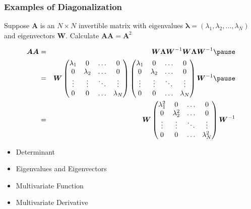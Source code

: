 \documentclass{beamer}
\numberwithin{equation}{section}
\begin{document}
\begin{frame}
\frametitle{Examples of Diagonalization}

Suppose $\boldsymbol{A}$ is an $N \times N$ invertible matrix with eigenvalues $\boldsymbol{\lambda} = (\lambda_{1}, \lambda_{2}, \hdots, \lambda_{N})$ and eigenvectors $\boldsymbol{W}$.  Calculate $\boldsymbol{A} \boldsymbol{A} = \boldsymbol{A}^{2}$ \pause

\begin{eqnarray}
\boldsymbol{A}\boldsymbol{A} & = & \boldsymbol{W} \boldsymbol{\Lambda} \boldsymbol{W}^{-1} \boldsymbol{W} \boldsymbol{\Lambda} \boldsymbol{W}^{-1} \nonumber \pause \\
& = &  \boldsymbol{W} \begin{pmatrix}
\lambda_{1} & 0 & \hdots & 0 \\
0 & \lambda_{2} & \hdots & 0 \\
\vdots & \vdots & \ddots & \vdots \\
0 & 0&  \hdots & \lambda_{N}\\
\end{pmatrix} \begin{pmatrix}
\lambda_{1} & 0 & \hdots & 0 \\
0 & \lambda_{2} & \hdots & 0 \\
\vdots & \vdots & \ddots & \vdots \\
0 & 0&  \hdots & \lambda_{N}\\
\end{pmatrix} \boldsymbol{W}^{-1} \nonumber \pause \\
& = & \boldsymbol{W} \begin{pmatrix}
\lambda_{1}^{2} & 0 & \hdots & 0 \\
0 & \lambda_{2}^{2} & \hdots & 0 \\
\vdots & \vdots & \ddots & \vdots \\
0 & 0&  \hdots & \lambda_{N}^{2} \\
\end{pmatrix} \boldsymbol{W}^{-1} \nonumber 
\end{eqnarray}


\end{frame}



\begin{frame}

\begin{itemize}
\item \textcolor{mygray}{Determinant}
\item \textcolor{mygray}{Eigenvalues and Eigenvectors}
\item \textcolor{myblack}{Multivariate Function}
\item \textcolor{mygray}{Multivariate Derivative}
\end{itemize}

\end{frame}
\end{document}
